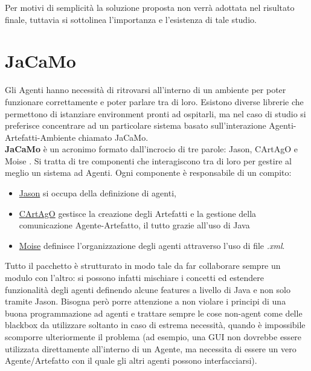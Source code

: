 \documentclass[12pt,a4paper,openright,oneside]{report}
\begin{document}
Per motivi di semplicità la soluzione proposta non verrà adottata nel risultato finale, tuttavia si sottolinea l'importanza e l'esistenza di tale studio.


\section{JaCaMo}
Gli Agenti hanno necessità di ritrovarsi all'interno di un ambiente per poter funzionare correttamente e poter parlare tra di loro. Esistono diverse librerie che permettono di istanziare environment pronti ad ospitarli, ma nel caso di studio si preferisce concentrare ad un particolare sistema basato sull'interazione Agenti-Artefatti-Ambiente chiamato JaCaMo.\\

\textbf{JaCaMo} \cite{jacamo} è un acronimo formato dall'incrocio di tre parole: Jason, CArtAgO \cite{cartago} e Moise \cite{moise}. Si tratta di tre componenti che interagiscono tra di loro per gestire al meglio un sistema ad Agenti. Ogni componente è responsabile di un compito:

\begin{itemize}
	\item \ul{Jason} si occupa della definizione di agenti,
	\item \ul{CArtAgO} gestisce la creazione degli Artefatti e la gestione della comunicazione Agente-Artefatto, il tutto grazie all'uso di Java
	\item \ul{Moise} definisce l'organizzazione degli agenti attraverso l'uso di file \textit{.xml}.
\end{itemize}

Tutto il pacchetto è strutturato in modo tale da far collaborare sempre un modulo con l'altro: si possono infatti mischiare i concetti ed estendere funzionalità degli agenti definendo alcune features a livello di Java e non solo tramite Jason. Bisogna però porre attenzione a non violare i principi di una buona programmazione ad agenti e trattare sempre le cose non-agent come delle blackbox da utilizzare soltanto in caso di estrema necessità, quando è impossibile scomporre ulteriormente il problema (ad esempio, una GUI non dovrebbe essere utilizzata direttamente all'interno di un Agente, ma necessita di essere un vero Agente/Artefatto con il quale gli altri agenti possono interfacciarsi).\\
\end{document}

